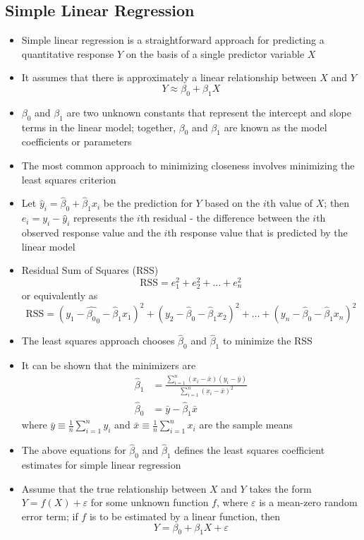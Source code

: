 \documentclass[12pt]{article}
\begin{document}
\subsection{Simple Linear Regression}
\begin{itemize}
\item Simple linear regression is a straightforward approach for predicting a quantitative response $Y$ on the basis of a single predictor variable $X$
\item It assumes that there is approximately a linear relationship between $X$ and $Y$
$$ Y \approx \beta_0 + \beta_1X $$ 
\item $\beta_0$ and $\beta_1$ are two unknown constants that represent the intercept and slope terms in the linear model; together, $\beta_0$ and $\beta_1$ are known as the model coefficients or parameters 
\item The most common approach to minimizing closeness involves minimizing the least squares criterion
\item Let $\hat{y}_i = \hat{\beta}_0 + \hat{\beta}_1x_i$ be the prediction for $Y$ based on the $i$th value of $X$; then $e_i = y_i - \hat{y}_i$ represents the $i$th residual - the difference between the $i$th observed response value and the $i$th response value that is predicted by the linear model
\item Residual Sum of Squares (RSS) $$ \text{RSS} = e_1^2 + e_2^2 + \dots + e_n^2 $$  or equivalently as $$ \text{RSS} = (y_1 - \hat{\beta_0}_0 - \hat{\beta}_1x_1)^2 + (y_2 - \hat{\beta}_0 - \hat{\beta}_1x_2)^2 + \dots + (y_n - \hat{\beta}_0 - \hat{\beta}_1x_n)^2 $$ 
\item The least squares approach chooses $\hat{\beta}_0$ and $\hat{\beta}_1$ to minimize the RSS
\item It can be shown that the minimizers are $$ \begin{aligned} 
\hat{\beta}_1 &= \frac{\sum_{i=1}^n (x_i - \bar{x})(y_i - \bar{y})}{\sum_{i=1}^n (x_i - \bar{x})^2} \\ \hat{\beta}_0 &= \bar{y} - \hat{\beta}_1\bar{x} \end{aligned} $$ 
where $\bar{y} \equiv \frac{1}{n}\sum_{i=1}^n y_i$ and $\bar{x} \equiv \frac{1}{n} \sum_{i=1}^n x_i$ are the sample means 
\item The above equations for $\hat{\beta}_0$ and $\hat{\beta}_1$ defines the least squares coefficient estimates for simple linear regression 
\item Assume that the true relationship between $X$ and $Y$ takes the form $Y = f(X) + \varepsilon$ for some unknown function $f$, where $\varepsilon$ is a mean-zero random error term; if $f$ is to be estimated by a linear function, then $$Y = \beta_0 + \beta_1X + \varepsilon $$ 

\end{itemize}
\end{document}
